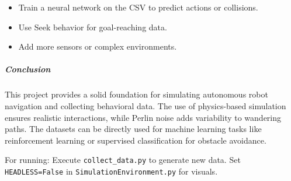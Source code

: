 \begin{itemize}
\item Train a neural network on the CSV to predict actions or collisions.
\item Use Seek behavior for goal-reaching data.
\item Add more sensors or complex environments.
\end{itemize}

\subparagraph{Conclusion}

This project provides a solid foundation for simulating autonomous robot navigation and collecting behavioral data. The use of physics-based simulation ensures realistic interactions, while Perlin noise adds variability to wandering paths. The datasets can be directly used for machine learning tasks like reinforcement learning or supervised classification for obstacle avoidance.

For running: Execute \texttt{collect\_data.py} to generate new data. Set \texttt{HEADLESS=False} in \texttt{SimulationEnvironment.py} for visuals.